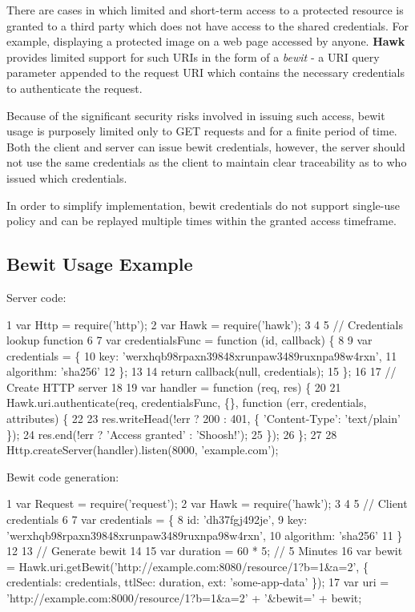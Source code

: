 There are cases in which limited and short-\/term access to a protected resource is granted to a third party which does not have access to the shared credentials. For example, displaying a protected image on a web page accessed by anyone. {\bfseries Hawk} provides limited support for such U\+R\+Is in the form of a {\itshape bewit} -\/ a U\+R\+I query parameter appended to the request U\+R\+I which contains the necessary credentials to authenticate the request.

Because of the significant security risks involved in issuing such access, bewit usage is purposely limited only to G\+E\+T requests and for a finite period of time. Both the client and server can issue bewit credentials, however, the server should not use the same credentials as the client to maintain clear traceability as to who issued which credentials.

In order to simplify implementation, bewit credentials do not support single-\/use policy and can be replayed multiple times within the granted access timeframe.

\subsection*{Bewit Usage Example}

Server code\+:


\begin{DoxyCode}
1 var Http = require('http');
2 var Hawk = require('hawk');
3 
4 
5 // Credentials lookup function
6 
7 var credentialsFunc = function (id, callback) \{
8 
9     var credentials = \{
10         key: 'werxhqb98rpaxn39848xrunpaw3489ruxnpa98w4rxn',
11         algorithm: 'sha256'
12     \};
13 
14     return callback(null, credentials);
15 \};
16 
17 // Create HTTP server
18 
19 var handler = function (req, res) \{
20 
21     Hawk.uri.authenticate(req, credentialsFunc, \{\}, function (err, credentials, attributes) \{
22 
23         res.writeHead(!err ? 200 : 401, \{ 'Content-Type': 'text/plain' \});
24         res.end(!err ? 'Access granted' : 'Shoosh!');
25     \});
26 \};
27 
28 Http.createServer(handler).listen(8000, 'example.com');
\end{DoxyCode}


Bewit code generation\+:


\begin{DoxyCode}
1 var Request = require('request');
2 var Hawk = require('hawk');
3 
4 
5 // Client credentials
6 
7 var credentials = \{
8     id: 'dh37fgj492je',
9     key: 'werxhqb98rpaxn39848xrunpaw3489ruxnpa98w4rxn',
10     algorithm: 'sha256'
11 \}
12 
13 // Generate bewit
14 
15 var duration = 60 * 5;      // 5 Minutes
16 var bewit = Hawk.uri.getBewit('http://example.com:8080/resource/1?b=1&a=2', \{ credentials: credentials,
       ttlSec: duration, ext: 'some-app-data' \});
17 var uri = 'http://example.com:8000/resource/1?b=1&a=2' + '&bewit=' + bewit;
\end{DoxyCode}


